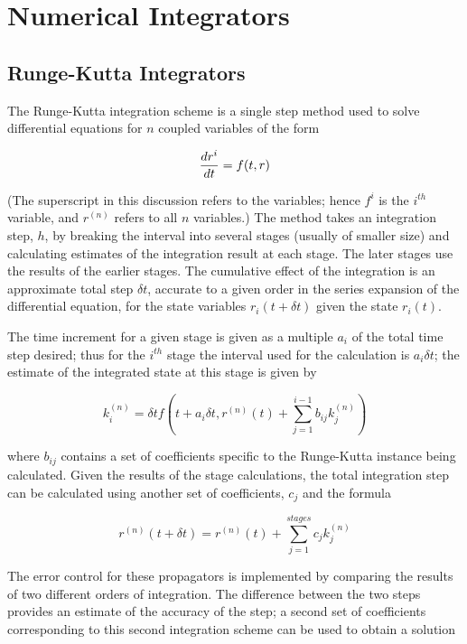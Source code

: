 \chapter{Numerical Integrators} \label{Ch:NumericalIntegrators}

\section{Runge-Kutta Integrators} 

The Runge-Kutta integration scheme is a single step method used to
solve  differential equations for $n$ coupled variables of the
form

\[{{dr^i}\over{dt}} = f(t,r)\]

(The superscript in this discussion refers to the variables; hence
$f^i$ is the $i^{th}$ variable, and $r^{(n)}$ refers to all $n$
variables.) The method takes an integration step, $h$, by breaking
the  interval into several stages (usually of smaller size) and
calculating  estimates of the integration result at each stage.
The later stages use the  results of the earlier stages. The
cumulative effect of the integration is  an approximate total step
$\delta t$, accurate to a given order in the  series expansion of
the differential equation, for the state variables  $r_i(t+\delta
t)$ given the state $r_i(t)$.

The time increment for a given stage is given as a multiple $a_i$
of the  total time step desired; thus for the $i^{th}$ stage the
interval used  for the calculation is $a_i \delta t$; the estimate
of the integrated  state at this stage is given by

\[ k_i^{(n)} = \delta t f(t+a_i\delta t, r^{(n)}(t) + \sum_{j=1}^{i-1}b_{ij}k_j^{(n)}) \]

where $b_{ij}$ contains a set of coefficients specific to the
Runge-Kutta instance being calculated. Given the results of the
stage calculations, the  total integration step can be calculated
using another set of coefficients, $c_j$ and the formula

\[ r^{(n)}(t+\delta t) = r^{(n)}(t) + \sum_{j=1}^{stages}c_j k_j^{(n)} \]

The error control for these propagators is implemented by
comparing the  results of two different orders of integration. The
difference between the  two steps provides an estimate of the
accuracy of the step; a second set of  coefficients corresponding
to this second integration scheme can be used to obtain a solution

